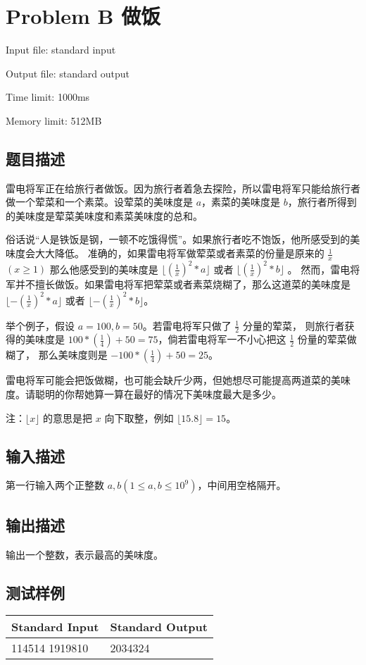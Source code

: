 \newpage
\section{Problem B 做饭}
{ \limitfont{}
Input file: standard input \par
Output file: standard output \par
Time limit: 1000ms \par
Memory limit: 512MB \par
}
\subsection*{题目描述}

雷电将军正在给旅行者做饭。因为旅行者着急去探险，所以雷电将军只能给旅行者做一个荤菜和一个素菜。设荤菜的美味度是 $a$，素菜的美味度是 $b$，旅行者所得到的美味度是荤菜美味度和素菜美味度的总和。

俗话说“人是铁饭是钢，一顿不吃饿得慌”。如果旅行者吃不饱饭，他所感受到的美味度会大大降低。
准确的，如果雷电将军做荤菜或者素菜的份量是原来的 $\frac{1}{x}$ $(x \ge 1)$ 
那么他感受到的美味度是 $\lfloor(\frac{1}{x})^2 *a\rfloor$ 或者 $\lfloor (\frac{1}{x})^2*b \rfloor$ 。
然而，雷电将军并不擅长做饭。如果雷电将军把荤菜或者素菜烧糊了，那么这道菜的美味度是$\lfloor -(\frac{1}{x})^2 *a\rfloor$ 
或者 $\lfloor-(\frac{1}{x})^2 *b\rfloor$。

举个例子，假设 $a=100,b=50$。若雷电将军只做了 $\frac{1}{2}$ 分量的荤菜，
则旅行者获得的美味度是 $100*(\frac{1}{4})+50=75$，倘若雷电将军一不小心把这 $\frac{1}{2}$ 份量的荤菜做糊了，
那么美味度则是 $-100*(\frac{1}{4})+50=25$。

雷电将军可能会把饭做糊，也可能会缺斤少两，但她想尽可能提高两道菜的美味度。请聪明的你帮她算一算在最好的情况下美味度最大是多少。

注：$\lfloor x \rfloor$ 的意思是把 $x$ 向下取整，例如 $\lfloor 15.8 \rfloor = 15$。

\subsection*{输入描述}

第一行输入两个正整数 $a,b(1 \leq a,b \leq 10^9)$，中间用空格隔开。

\subsection*{输出描述}

输出一个整数，表示最高的美味度。

\subsection*{测试样例}

\begin{table}[H]
\begin{tabularx}{\textwidth}{|X|X|}
    \hline
    \textbf{Standard Input} & \textbf{Standard Output} \\ 
    \hline
    114514 1919810 & 2034324 \\
    \hline
\end{tabularx}
\end{table}